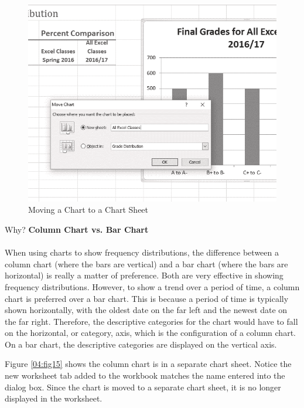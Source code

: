 \begin{figure}[H]
	\centering
	\includegraphics[width=\maxwidth{.95\linewidth}]{gfx/ch04_fig14}
	\caption{Moving a Chart to a Chart Sheet}
	\label{04:fig14}
\end{figure}

\begin{center}
	\begin{infobox}{Why?}
		\textbf{Column Chart vs. Bar Chart}
		\\
		\\
		When using charts to show frequency distributions, the difference between a column chart (where the bars are vertical) and a bar chart (where the bars are horizontal) is really a matter of preference. Both are very effective in showing frequency distributions. However, to show a trend over a period of time, a column chart is preferred over a bar chart. This is because a period of time is typically shown horizontally, with the oldest date on the far left and the newest date on the far right. Therefore, the descriptive categories for the chart would have to fall on the horizontal, or category, axis, which is the configuration of a column chart. On a bar chart, the descriptive categories are displayed on the vertical axis.
	\end{infobox}
\end{center}

Figure \ref{04:fig15} shows the  column chart is in a separate chart sheet. Notice the new worksheet tab added to the workbook matches the name entered into the  dialog box. Since the chart is moved to a separate chart sheet, it is no longer displayed in the  worksheet.

